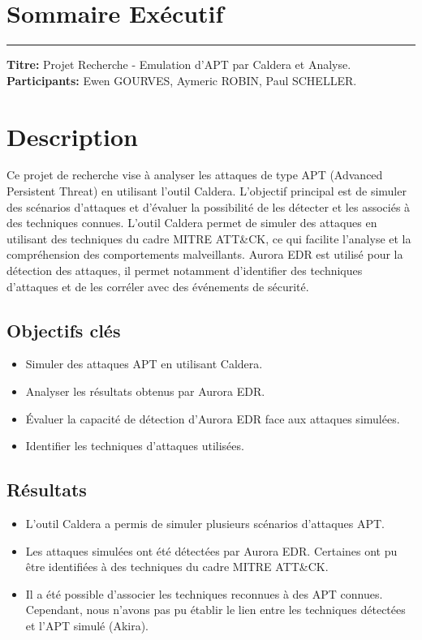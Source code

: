 \documentclass[12pt,a4paper]{article}
\begin{document}
\section*{Sommaire Exécutif}

\hrule
\vspace{0.4cm}

\textbf{Titre:} Projet Recherche - Emulation d'APT par Caldera et Analyse. \\
\textbf{Participants:} Ewen GOURVES, Aymeric ROBIN, Paul SCHELLER.

\section*{Description}
Ce projet de recherche vise à analyser les attaques de type APT (Advanced Persistent Threat) en utilisant l'outil Caldera.
L'objectif principal est de simuler des scénarios d'attaques et d'évaluer la possibilité de les détecter et les associés à des techniques connues.
L'outil Caldera permet de simuler des attaques en utilisant des techniques du cadre MITRE ATT\&CK, ce qui facilite l'analyse et la compréhension des comportements malveillants.
Aurora EDR est utilisé pour la détection des attaques, il permet notamment d'identifier des techniques d'attaques et de les corréler avec des événements de sécurité.

\subsection*{Objectifs clés}
\begin{itemize}
    \item Simuler des attaques APT en utilisant Caldera.
    \item Analyser les résultats obtenus par Aurora EDR.
    \item Évaluer la capacité de détection d'Aurora EDR face aux attaques simulées.
    \item Identifier les techniques d'attaques utilisées.
\end{itemize}

\subsection*{Résultats}
\begin{itemize}
    \item L'outil Caldera a permis de simuler plusieurs scénarios d'attaques APT.
    \item Les attaques simulées ont été détectées par Aurora EDR. Certaines ont pu être identifiées à des techniques du cadre MITRE ATT\&CK.
    \item Il a été possible d'associer les techniques reconnues à des APT connues. Cependant, nous n'avons pas pu établir le lien entre les techniques détectées et l'APT simulé (Akira).
\end{itemize}
\end{document}
